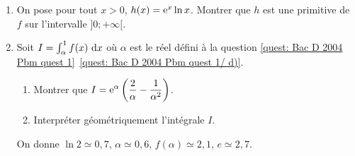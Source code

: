 \begin{enumerate}
\begin{enumerate}
                  \end{enumerate}
            \item On pose pour tout $x > 0$, $h(x) = \mathrm{e}^{x} \ln x$.
                  Montrer que $h$ est une primitive de $f$ sur l'intervalle $]0 ; +\infty[$.
            \item Soit $I = \int_{\alpha}^{1} f(x) ~\mathrm{d}x$ o\`u $\alpha$ est le r\'eel d\'efini \`a la question 
                  \ref{quest: Bac D 2004 Pbm quest 1}~\ref{quest: Bac D 2004 Pbm quest 1/ d)}.
                  \begin{enumerate}
                        \item Montrer que 
                              $\displaystyle{ I = \mathrm{e}^{\alpha} \left( \frac{2}{\alpha} - \frac{1}{\alpha^2} \right) }$.
                        \item Interpr\'eter g\'eom\'etriquement l'int\'egrale $I$.
                  \end{enumerate}
                  On donne $\ln 2 \simeq 0,7$, $\alpha \simeq 0,6$, $f(\alpha) \simeq 2,1$, $e \simeq 2,7$.
      \end{enumerate}






